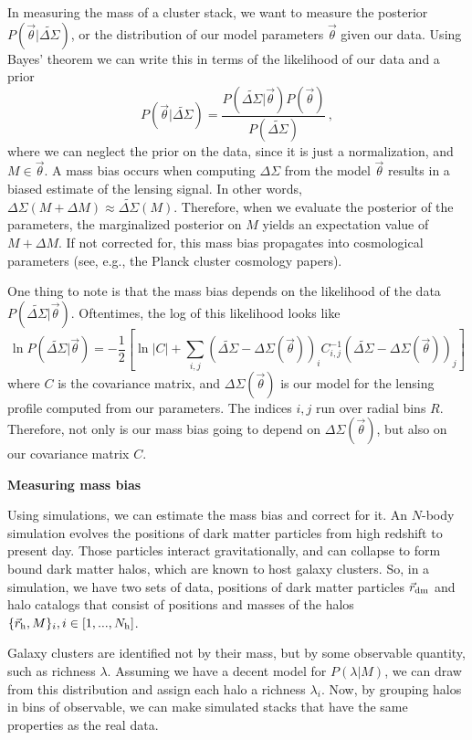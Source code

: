 \documentclass[12pt]{article}
\newcommand{\wds}{\widetilde{\Delta\Sigma}}
\newcommand{\ds}{\Delta\Sigma}
\newcommand{\model}{\vec{\theta}}
\begin{document}
In measuring the mass of a cluster stack, we want to measure the posterior $P(\vec{\theta}|\wds)$, or the distribution of our model parameters $\vec{\theta}$ given our data. Using Bayes' theorem we can write this in terms of the likelihood of our data and a prior
%
\begin{equation}
	\label{eq:posterior}
	P(\vec{\theta}|\wds) = \frac{P(\wds|\vec{\theta})P(\vec{\theta})}{P(\wds)}\,,
\end{equation}
%
where we can neglect the prior on the data, since it is just a normalization, and $M\in\model$. A mass bias occurs when computing $\ds$ from the model $\model$ results in a biased estimate of the lensing signal. In other words, $\Delta\Sigma(M+\Delta M) \approx \wds(M)$. Therefore, when we evaluate the posterior of the parameters, the marginalized posterior on $M$ yields an expectation value of $M+\Delta M$. If not corrected for, this mass bias propagates into cosmological parameters (see, e.g., the Planck cluster cosmology papers).

One thing to note is that the mass bias depends on the likelihood of the data $P(\wds|\vec{\theta})$. Oftentimes, the log of this likelihood looks like
%
\begin{equation}
	\label{eq:likelihood}
	\ln P(\wds|\vec{\theta}) = -\frac{1}{2}\left[ \ln|C| +\sum_{i,j} (\wds - \Delta\Sigma(\model))_i C_{i,j}^{-1}(\wds - \Delta\Sigma(\model))_j  \right]
\end{equation}
%
where $C$ is the covariance matrix, and $\ds(\model)$ is our model for the lensing profile computed from our parameters. The indices $i,j$ run over radial bins $R$. Therefore, not only is our mass bias going to depend on $\ds(\model)$, but also on our covariance matrix $C$.

\vspace{12pt}
\noindent
{\bf Measuring mass bias}

Using simulations, we can estimate the mass bias and correct for it. An $N$-body simulation evolves the positions of dark matter particles from high redshift to present day. Those particles interact gravitationally, and can collapse to form bound dark matter halos, which are known to host galaxy clusters. So, in a simulation, we have two sets of data, positions of dark matter particles $\vec{r}_{\rm dm}$ and halo catalogs that consist of positions and masses of the halos $\{\vec{r}_{\rm h}, M\}_i, i\in[1,...,N_{\rm h}]$.

Galaxy clusters are identified not by their mass, but by some observable quantity, such as richness $\lambda$. Assuming we have a decent model for $P(\lambda|M)$, we can draw from this distribution and assign each halo a richness $\lambda_i$. Now, by grouping halos in bins of observable, we can make simulated stacks that have the same properties as the real data.
\end{document}

